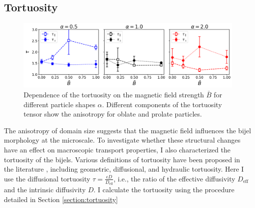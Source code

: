 \subsection{Tortuosity}

\begin{figure}
\centering
\includegraphics[scale = 0.4]{figures/results/paper1/tortuosity_compare.png}
\caption{Dependence of the tortuosity on the magnetic field strength $\bar{B}$ for different particle shapes $\alpha$. 
         Different components of the tortuosity tensor show the anisotropy for oblate and prolate particles.}
\label{fig:tau_B}
\end{figure}

The anisotropy of domain size suggests that the magnetic field
influences the bijel morphology at the microscale. To investigate
whether these structural changes have an effect on macroscopic
transport properties, I also characterized the tortuosity of the
bijels. Various definitions of tortuosity have been proposed in the
literature \cite{dasilva_tortuosity_2022}, including geometric,
diffusional, and hydraulic tortuosity. Here I use the diffusional
tortuosity $\tau= \frac{\epsilon D}{D_{\text{eff}}}$, i.e., the ratio of the 
effective diffusivity $D_{\text{eff}}$ and the intrinsic diffusivity
$D$. I calculate the tortuosity using the procedure detailed in Section \ref{section:tortuosity}

